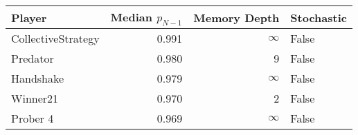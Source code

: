 \begin{tabular}{lrrl}
\toprule
             Player &  Median $p_{N-1}$ &  Memory Depth & Stochastic \\
\midrule
 CollectiveStrategy &             0.991 &            \(\infty\) &      False \\
           Predator &             0.980 &             9 &      False \\
          Handshake &             0.979 &            \(\infty\) &      False \\
           Winner21 &             0.970 &             2 &      False \\
           Prober 4 &             0.969 &            \(\infty\) &      False \\
\bottomrule
\end{tabular}
